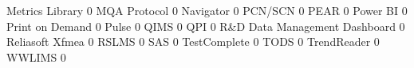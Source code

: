 \documentclass{article}
\begin{document}
\begin{Schunk}
\begin{Soutput}
  Metrics Library                                                           0
  MQA Protocol                                                              0
  Navigator                                                                 0
  PCN/SCN                                                                   0
  PEAR                                                                      0
  Power BI                                                                  0
  Print on Demand                                                           0
  Pulse                                                                     0
  QIMS                                                                      0
  QPI                                                                       0
  R&D Data Management Dashboard                                             0
  Reliasoft Xfmea                                                           0
  RSLMS                                                                     0
  SAS                                                                       0
  TestComplete                                                              0
  TODS                                                                      0
  TrendReader                                                               0
  WWLIMS                                                                    0
                                                           

\end{Soutput}
\end{Schunk}
\end{document}
